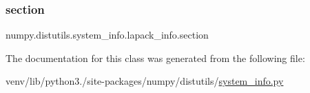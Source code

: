 \subsubsection{\texorpdfstring{section}{section}}
{\footnotesize\ttfamily numpy.\+distutils.\+system\+\_\+info.\+lapack\+\_\+info.\+section\hspace{0.3cm}{\ttfamily [static]}}



The documentation for this class was generated from the following file\+:\begin{DoxyCompactItemize}
\item 
venv/lib/python3./site-\/packages/numpy/distutils/\hyperlink{system__info_8py}{system\+\_\+info.\+py}\end{DoxyCompactItemize}
